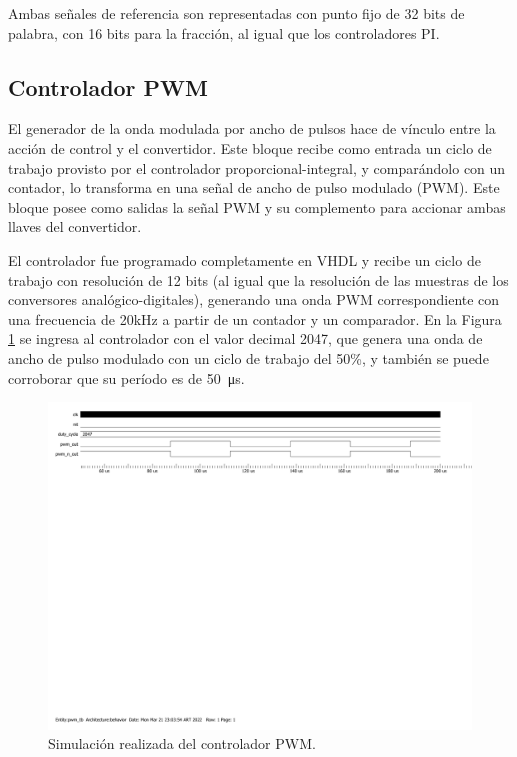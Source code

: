 Ambas señales de referencia son representadas con punto fijo de 32 bits de palabra, con 16 bits para la fracción, al igual que los controladores PI.

\subsection{Controlador PWM}

El generador de la onda modulada por ancho de pulsos hace de vínculo entre la acción de control y el convertidor. Este bloque recibe como entrada un ciclo de trabajo provisto por el controlador proporcional-integral, y comparándolo con un contador, lo transforma en una señal de ancho de pulso modulado (PWM). Este bloque posee como salidas la señal PWM y su complemento para accionar ambas llaves del convertidor.

El controlador fue programado completamente en VHDL y recibe un ciclo de trabajo con resolución de 12 bits (al igual que la resolución de las muestras de los conversores analógico-digitales), generando una onda PWM correspondiente con una frecuencia de 20kHz a partir de un contador y un comparador. En la Figura \ref{simulacion-pwm} se ingresa al controlador con el valor decimal 2047, que genera una onda de ancho de pulso modulado con un ciclo de trabajo del 50\%, y también se puede corroborar que su período es de \SI{50}{\micro\second}.

\begin{figure}[hbt!]
    \centering
    \includegraphics[width=0.85\columnwidth]{Imágenes/Controlador PWM/Simulación en ModelSim.pdf}    
    \caption{Simulación realizada del controlador PWM.}
    \label{simulacion-pwm}
\end{figure} 

